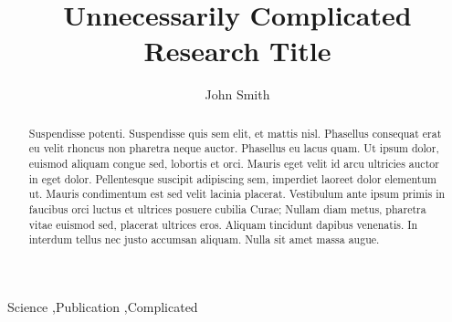 \documentclass[preprint,12pt]{elsarticle}
\begin{document}
\begin{frontmatter}


\title{Unnecessarily Complicated Research Title}




\author{John Smith}

\address{California, United States}

\begin{abstract}
Suspendisse potenti. Suspendisse quis sem elit, et mattis nisl. Phasellus consequat erat eu velit rhoncus non pharetra neque auctor. Phasellus eu lacus quam. Ut ipsum dolor, euismod aliquam congue sed, lobortis et orci. Mauris eget velit id arcu ultricies auctor in eget dolor. Pellentesque suscipit adipiscing sem, imperdiet laoreet dolor elementum ut. Mauris condimentum est sed velit lacinia placerat. Vestibulum ante ipsum primis in faucibus orci luctus et ultrices posuere cubilia Curae; Nullam diam metus, pharetra vitae euismod sed, placerat ultrices eros. Aliquam tincidunt dapibus venenatis. In interdum tellus nec justo accumsan aliquam. Nulla sit amet massa augue.
\end{abstract}

\begin{keyword}
Science \sep Publication \sep Complicated


\end{keyword}

\end{frontmatter}
\end{document}
